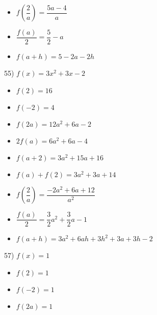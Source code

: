 \documentclass[12pt]{book}
\theoremstyle{definition}
\begin{document}
\begin{multicols}{3}
\begin{itemize}
\item  $f \left( \dfrac{2}{a} \right)=\dfrac{5a-4}{a}$
\item $\dfrac{f(a)}{2}=\dfrac{5}{2}-a$
\item  $f(a + h)=5-2a-2h$
\end{itemize}
\end{multicols}

55) $f(x)=3x^2+3x-2$
\begin{multicols}{3}
\begin{itemize}
\item  $f(2)=16$
\item  $f(-2)=4$
\item  $f(2a)=12a^2+6a-2$
\end{itemize}
\end{multicols}

\begin{multicols}{3}
\begin{itemize}
\item  $2 f(a)=6a^2+6a-4$
\item $f(a+2)=3a^2+15a+16$
\item $f(a) + f(2)=3a^2+3a+14$
\end{itemize}
\end{multicols}

\begin{multicols}{2}
\begin{itemize}
\item  $f \left( \dfrac{2}{a} \right)=\dfrac{-2a^2+6a+12}{a^2}$
\item $\dfrac{f(a)}{2}=\dfrac{3}{2}a^2+\dfrac{3}{2}a-1$
\end{itemize}
\end{multicols}

\begin{itemize}
\item  $f(a + h)=3a^2+6ah+3h^2+3a+3h-2$
\end{itemize}


57) $f(x)=1$
\begin{multicols}{3}
\begin{itemize}
\item  $f(2)=1$
\item  $f(-2)=1$
\item  $f(2a)=1$
\end{itemize}
\end{multicols}
\end{document}

